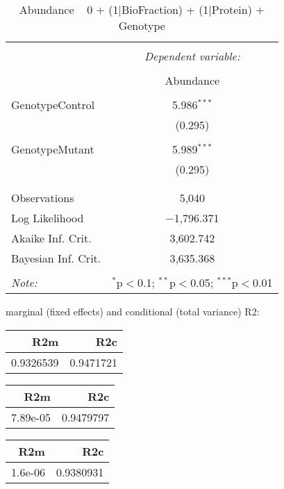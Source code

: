 \documentclass[11pt]{report}
\begin{document}
\begin{table}[!htbp] \centering 
  \caption{Abundance ~ 0 + (1|BioFraction) + (1|Protein) + Genotype} 
  \label{} 
\begin{tabular}{@{\extracolsep{5pt}}lc} 
\\[-1.8ex]\hline 
\hline \\[-1.8ex] 
 & \multicolumn{1}{c}{\textit{Dependent variable:}} \\ 
\cline{2-2} 
\\[-1.8ex] & Abundance \\ 
\hline \\[-1.8ex] 
 GenotypeControl & 5.986$^{***}$ \\ 
  & (0.295) \\ 
  & \\ 
 GenotypeMutant & 5.989$^{***}$ \\ 
  & (0.295) \\ 
  & \\ 
\hline \\[-1.8ex] 
Observations & 5,040 \\ 
Log Likelihood & $-$1,796.371 \\ 
Akaike Inf. Crit. & 3,602.742 \\ 
Bayesian Inf. Crit. & 3,635.368 \\ 
\hline 
\hline \\[-1.8ex] 
\textit{Note:}  & \multicolumn{1}{r}{$^{*}$p$<$0.1; $^{**}$p$<$0.05; $^{***}$p$<$0.01} \\ 
\end{tabular} 
\end{table} 
marginal (fixed effects) and conditional (total variance) R2:

\begin{tabular}{r|r}
\hline
R2m & R2c\\
\hline
0.9326539 & 0.9471721\\
\hline
\end{tabular}

\begin{tabular}{r|r}
\hline
R2m & R2c\\
\hline
7.89e-05 & 0.9479797\\
\hline
\end{tabular}

\begin{tabular}{r|r}
\hline
R2m & R2c\\
\hline
1.6e-06 & 0.9380931\\
\hline
\end{tabular}
\end{document}
